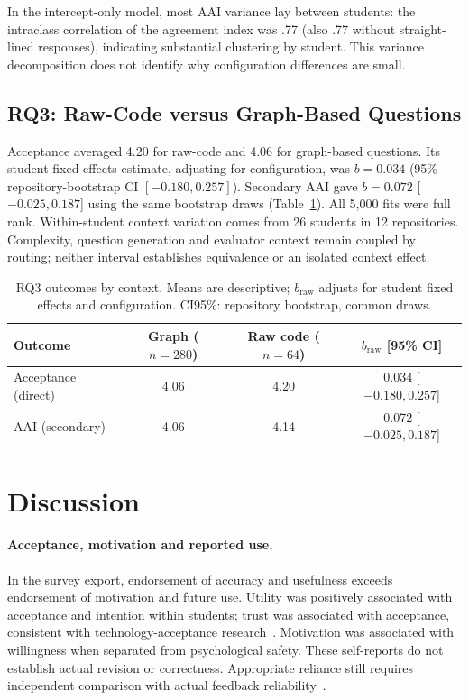 \documentclass[runningheads]{llncs}
\newif\ifrqthree \rqthreetrue
\begin{document}
In the intercept-only model, most AAI variance lay between students: the intraclass correlation of the agreement index was .77 (also .77 without straight-lined responses), indicating substantial clustering by student. This variance decomposition does not identify why configuration differences are small.



\ifrqthree
\subsection{RQ3: Raw-Code versus Graph-Based Questions}
Acceptance averaged 4.20 for raw-code and 4.06 for graph-based questions. Its student fixed-effects estimate, adjusting for configuration, was $b=0.034$ (95\% repository-bootstrap CI $[-0.180,0.257]$). Secondary AAI gave $b=0.072$ [$-0.025,0.187$] using the same bootstrap draws (Table~\ref{tab:rq3}). All 5,000 fits were full rank. Within-student context variation comes from 26 students in 12 repositories. Complexity, question generation and evaluator context remain coupled by routing; neither interval establishes equivalence or an isolated context effect.

\begin{table}[t]
\caption{RQ3 outcomes by context. Means are descriptive; $b_\text{raw}$ adjusts for student fixed effects and configuration. CI95\%: repository bootstrap, common draws.}
\label{tab:rq3}
\centering\scriptsize
\begin{tabular}{@{}lccc@{}}
\toprule
Outcome & Graph ($n=280$) & Raw code ($n=64$) & $b_\text{raw}$ [95\% CI] \\
\midrule
Acceptance (direct) & 4.06 & 4.20 & 0.034 [$-0.180,0.257$] \\
AAI (secondary) & 4.06 & 4.14 & 0.072 [$-0.025,0.187$] \\
\bottomrule
\end{tabular}
\end{table}
\fi

\section{Discussion}
\label{sec:discussion}

\paragraph{Acceptance, motivation and reported use.}
In the survey export, endorsement of accuracy and usefulness exceeds endorsement of motivation and future use. Utility was positively associated with acceptance and intention within students; trust was associated with acceptance, consistent with technology-acceptance research~\cite{davis1989perceived,venkatesh2003user}. Motivation was associated with willingness when separated from psychological safety. These self-reports do not establish actual revision or correctness. Appropriate reliance still requires independent comparison with actual feedback reliability~\cite{lee2004trust}.
\end{document}
